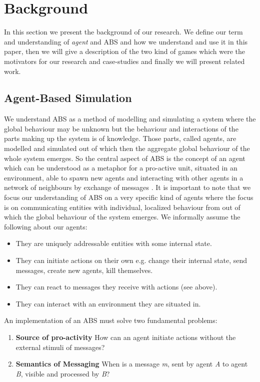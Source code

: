 \section{Background}
In this section we present the background of our research. We define our term and understanding of \textit{agent} and ABS and how we understand and use it in this paper, then we will give a description of the two kind of games which were the motivators for our research and case-studies and finally we will present related work.

\subsection{Agent-Based Simulation}
We understand ABS as a method of modelling and simulating a system where the global behaviour may be unknown but the behaviour and interactions of the parts making up the system is of knowledge. Those parts, called agents, are modelled and simulated out of which then the aggregate global behaviour of the whole system emerges. So the central aspect of ABS is the concept of an agent which can be understood as a metaphor for a pro-active unit, situated in an environment, able to spawn new agents and interacting with other agents in a network of neighbours by exchange of messages \cite{wooldridge_introduction_2009}. It is important to note that we focus our understanding of ABS on a very specific kind of agents where the focus is on communicating entities with individual, localized behaviour from out of which the global behaviour of the system emerges. We informally assume the following about our agents:

\begin{itemize}
	\item They are uniquely addressable entities with some internal state.
	\item They can initiate actions on their own e.g. change their internal state, send messages, create new agents, kill themselves.
	\item They can react to messages they receive with actions (see above).
	\item They can interact with an environment they are situated in.
\end{itemize} 

An implementation of an ABS must solve two fundamental problems:

\begin{enumerate}
	\item \textbf{Source of pro-activity} How can an agent initiate actions without the external stimuli of messages?
	\item \textbf{Semantics of Messaging} When is a message \textit{m}, sent by agent \textit{A} to agent \textit{B}, visible and processed by \textit{B}?
\end{enumerate}

